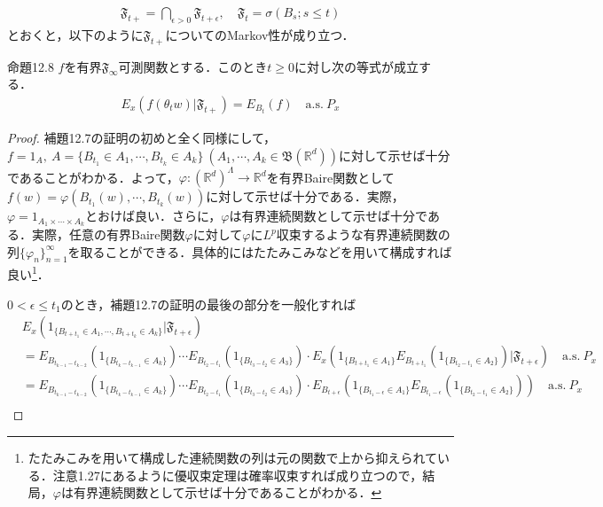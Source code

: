 \documentclass[dvipdfmx]{jsarticle}
\newtheorem{proof}{証明}
\begin{document}
%
%
%
%
\begin{align*}
\mathfrak{F}_{t+}=\bigcap_{\epsilon>0}\mathfrak{F}_{t+\epsilon}, \quad \mathfrak{F}_t=\sigma(B_s;s\leq t)
\end{align*}
とおくと，以下のように$\mathfrak{F}_{t+}$についてのMarkov性が成り立つ．
\begin{itembox}[l]{\cite{kotani}命題12.8}
$f$を有界$\mathfrak{F}_{\infty}$可測関数とする．このとき$t\geq 0$に対し次の等式が成立する．
\begin{align*}
E_x(f(\theta_t w)|\mathfrak{F}_{t+})=E_{B_t}(f) \quad \mathrm{a.s.}{\ }P_x
\end{align*}
\end{itembox}
\vspace{-0.7zh}%
\vspace{-0.7zh}%
\begin{proof}
\cite{kotani}補題12.7の証明の初めと全く同様にして，$f=1_A,{\ }A=\{B_{t_1}\in A_1,\cdots,B_{t_k}\in A_k\}{\ }(A_1,\cdots,A_k\in\mathfrak{B}(\mathbb{R}^d))$に対して示せば十分であることがわかる．よって，$\varphi:(\mathbb{R}^d)^\Lambda\to \mathbb{R}^d$を有界Baire関数として$f(w)=\varphi(B_{t_1}(w),\cdots,B_{t_k}(w))$に対して示せば十分である．実際，$\varphi=1_{A_1\times \cdots\times A_k}$とおけば良い．さらに，$\varphi$は有界連続関数として示せば十分である．実際，任意の有界Baire関数$\varphi$に対して$\varphi$に$L^p$収束するような有界連続関数の列$\{\varphi_n\}_{n=1}^\infty$を取ることができる．具体的にはたたみこみなどを用いて構成すれば良い\footnote{たたみこみを用いて構成した連続関数の列は元の関数で上から抑えられている．\cite{taniguchi}注意1.27にあるように優収束定理は確率収束すれば成り立つので，結局，$\varphi$は有界連続関数として示せば十分であることがわかる．}．\par
$0<\epsilon\leq t_1$のとき，\cite{kotani}補題12.7の証明の最後の部分を一般化すれば
\begin{align*}
&E_x(1_{\{B_{t+t_1}\in A_1,\cdots,B_{t+t_k}\in A_k\}}|\mathfrak{F}_{t+\epsilon}) \\
&=E_{B_{t_{k-1}-t_{k-2}}}(1_{\{B_{t_k-t_{k-1}}\in A_k\}})\cdots E_{B_{t_{2}-t_{1}}}(1_{\{B_{t_3-t_{2}}\in A_3\}})\cdot E_x(1_{\{B_{t+t_1}\in A_1\}}E_{B_{t+t_{1}}}(1_{\{B_{t_2-t_{1}}\in A_2\}})|\mathfrak{F}_{t+\epsilon}) \quad \mathrm{a.s.}{\ }P_x \\
&=E_{B_{t_{k-1}-t_{k-2}}}(1_{\{B_{t_k-t_{k-1}}\in A_k\}})\cdots E_{B_{t_{2}-t_{1}}}(1_{\{B_{t_3-t_{2}}\in A_3\}})\cdot E_{B_{t+\epsilon}}(1_{\{B_{t_1-\epsilon}\in A_1\}}E_{B_{t_{1}-\epsilon}}(1_{\{B_{t_2-t_{1}}\in A_2\}})) \quad \mathrm{a.s.}{\ }P_x \\

\end{align*}
\end{proof}
\end{document}
